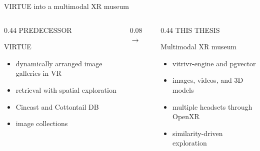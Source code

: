 \begin{frame}[c]{VIRTUE into a multimodal XR museum}
\begin{columns}[T,onlytextwidth]
  \begin{column}{0.44\textwidth}
    \textcolor{unigrey}{\large PREDECESSOR}

    \vspace{0.12cm}
    \Large VIRTUE

    \vspace{0.15cm}
    \small
    \begin{itemize}
      \item dynamically arranged image galleries in VR
      \item retrieval with spatial exploration
      \item Cineast and Cottontail DB
      \item image collections
    \end{itemize}
  \end{column}
  \begin{column}{0.08\textwidth}
    \vspace{1.45cm}
    \centering
    \Huge$\rightarrow$
  \end{column}
  \begin{column}{0.44\textwidth}
    \textcolor{unimint}{\large THIS THESIS}

    \vspace{0.12cm}
    \Large Multimodal XR museum

    \vspace{0.15cm}
    \small
    \begin{itemize}
      \item vitrivr-engine and pgvector
      \item images, videos, and 3D models
      \item multiple headsets through OpenXR
      \item similarity-driven exploration
    \end{itemize}
  \end{column}
\end{columns}
\end{frame}
